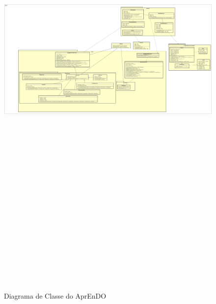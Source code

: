 \begin{landscape}
  \begin{figure}[H]
  \caption{Diagrama de Classe do AprEnDO}
  \includegraphics[width=249mm,height=240mm, keepaspectratio]{figuras/diagrama_classe.jpg}
  \label{fig:diagramaDeClasse}
  \end{figure}
\end{landscape}



